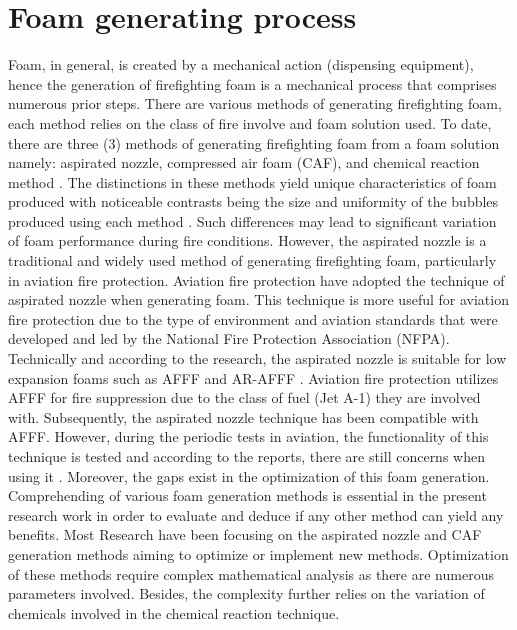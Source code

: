 \documentclass[12pt]{report}
\begin{document}
\section{Foam generating process}
Foam, in general, is created by a mechanical action (dispensing equipment), hence the generation of firefighting foam is a mechanical process that comprises numerous prior steps. There are various methods of generating firefighting foam, each method relies on the class of fire involve and foam solution used. To date, there are three (3) methods of generating firefighting foam from a foam solution namely: aspirated nozzle, compressed air foam (CAF), and chemical reaction method \cite{laundess2012suppression}. The distinctions in these methods yield unique characteristics of foam produced with noticeable contrasts being the size and uniformity of the bubbles produced using each method \cite{laundess2012suppression}. Such differences may lead to significant variation of foam performance during fire conditions. However, the aspirated nozzle is a traditional and widely used method of generating firefighting foam, particularly in aviation fire protection.
Aviation fire protection have adopted the technique of aspirated nozzle when generating foam. This technique is more useful for aviation fire protection due to the type of environment and aviation standards that were developed and led by the National Fire Protection Association (NFPA). Technically and according to the research, the aspirated nozzle is suitable for low expansion foams such as AFFF and AR-AFFF \cite{xi2017experimental}.  Aviation fire protection utilizes AFFF for fire suppression due to the class of fuel (Jet A-1) they are involved with. Subsequently, the aspirated nozzle technique has been compatible with AFFF. However, during the periodic tests in aviation, the functionality of this technique is tested and according to the reports, there are still concerns when using it \cite{laundess2012suppression}. Moreover, the gaps exist in the optimization of this foam generation.
Comprehending of various foam generation methods is essential in the present research work in order to evaluate and deduce if any other method can yield any benefits. Most Research have been focusing on the aspirated nozzle and CAF generation methods aiming to optimize or implement new methods. Optimization of these methods require complex mathematical analysis as there are numerous parameters involved. Besides, the complexity further relies on the variation of chemicals involved in the chemical reaction technique.
\end{document}
